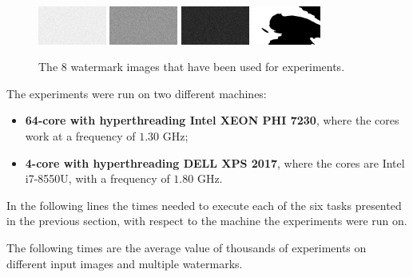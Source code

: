 \documentclass[12pt,a4paper,english]{article}
\begin{document}
\begin{figure}[h]
  \includegraphics[width=0.2\textwidth]{../Images/wm/random-05.png}\hspace{0.38cm}
  \includegraphics[width=0.2\textwidth]{../Images/wm/random-40.png}\hspace{0.38cm}
  \includegraphics[width=0.2\textwidth]{../Images/wm/random-85.png}\hspace{0.38cm}
  \includegraphics[width=0.2\textwidth]{../Images/wm/swirl-06.png}\caption{The $8$ watermark images that have been used for experiments.}\label{fig:wms}
\end{figure}

The experiments were run on two different machines:
\begin{itemize}
  \item {\bf 64-core with hyperthreading Intel XEON PHI 7230}, where the cores work at a frequency of $1.30$ GHz;  
  \item {\bf 4-core with hyperthreading DELL XPS 2017}, where the cores are Intel i7-8550U, with a frequency of $1.80$ GHz.
\end{itemize}

In the following lines the times needed to execute each of the six tasks presented in the previous section, with respect to the machine the experiments were run on.

The following times are the average value of thousands of experiments on different input images and multiple watermarks.
\end{document}
